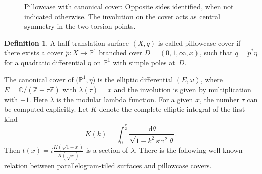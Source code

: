 \documentclass[10pt,a4paper]{amsart}
\numberwithin{equation}{section}
\theoremstyle{definition}
\newtheorem{defi}[theo]{Definition}
\renewcommand{\to}{\rightarrow}
\newcommand{\ZZ}{\mathbb{Z}}
\newcommand{\CC}{\mathbb{C}}
\newcommand{\PP}{\mathbb{P}}
\begin{document}
\begin{figure}[t]
 \centering
	\vspace{-2mm}

	\caption{Pillowcase with canonical cover: Opposite sides identified, when not indicated otherwise. The involution on the cover acts as central symmetry in the two-torsion points.} \label{fig:Pillowcase}
\end{figure}

\begin{defi} A half-translation surface $(X,q)$ is called pillowcase cover if there exists a cover $ \check{p}\colon X \to \PP^1$ branched over $D=(0,1,\infty,x)$, such that $q= \check{p}^*\eta$ for a quadratic differential $\eta$ on $\PP^1$ with simple poles at~$D$.
\end{defi}
The canonical cover of $\bigl(\PP^1,\eta\bigr)$ is the elliptic differential $(E,\omega)$, where $E=\CC/(\ZZ+\tau\ZZ)$ with $\lambda(\tau)=x$ and the involution is given by multiplication with $-1$. Here $\lambda$ is the modular lambda function.
For a given $x$, the number $\tau$ can be computed explicitly.
Let $K$ denote the complete elliptic integral of the first kind
\begin{equation} \label{eq:elliptic_integral}
	K(k) = \int_0^{\frac{\pi}{2}} \frac{\mathrm{d}\theta}{\sqrt{1-k^2\sin^2\theta}}.
\end{equation}
Then $t(x) = i\frac{K(\sqrt{1-x})}{K(\sqrt{x})}$ is a section of $\lambda$.
There is the following well-known relation between para\-llelo\-gram-tiled surfaces and pillowcase covers.
\end{document}
